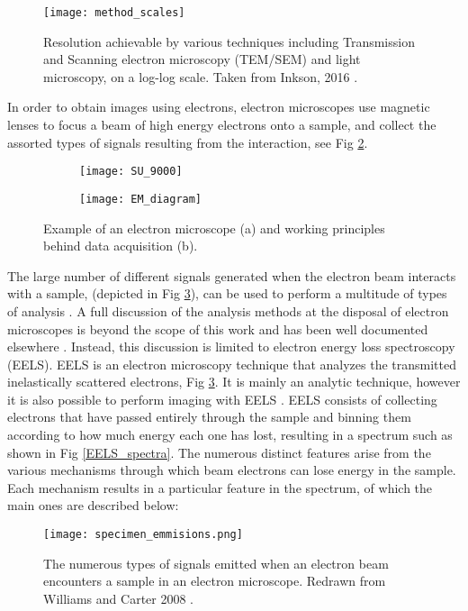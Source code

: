 \begin{figure}
	\centering
	\texttt{[image: method\_scales]}
	\caption{Resolution achievable by various techniques including Transmission and Scanning electron microscopy (TEM/SEM) and light microscopy, on a log-log scale.  Taken from Inkson, 2016 \cite{inkson_2_2016}.}
	\label{method_scales}
	
\end{figure}


In order to obtain images using electrons, electron microscopes use magnetic lenses to focus a beam of high energy electrons onto a sample, and collect the assorted types of signals resulting from the interaction, see Fig \ref{em_diagram}.\\


\begin{figure}
\begin{subfigure}{0.45\textwidth}
	\texttt{[image: SU\_9000]}
	\caption{}
\end{subfigure}
\hspace{0.05cm}
\begin{subfigure}{0.45\textwidth}
	\texttt{[image: EM\_diagram]}
	\caption{}
\end{subfigure}
	\caption{Example of an electron microscope (a) and working principles behind data acquisition (b). }
	\label{em_diagram}
\end{figure}

The large number of different signals generated when the electron beam interacts with a sample, (depicted in Fig \ref{specimen_emmisions}), can be used to perform a multitude of types of analysis \cite{williams_transmission_2008}.  A full discussion of the analysis methods at the disposal of electron microscopes is beyond the scope of this work and has been well documented elsewhere \cite{goldstein_electron_2003,Egerton,williams_transmission_2008,reimer_electron_1998}.  Instead, this discussion is limited to electron energy loss spectroscopy (EELS).  EELS is an electron microscopy technique that analyzes the transmitted inelastically scattered electrons, Fig \ref{specimen_emmisions}\cite{Egerton}.  It is mainly an analytic technique, however it is also possible to perform imaging with EELS \cite{varela_stem-eels_2012}.  EELS consists of collecting electrons that have passed entirely through the sample and binning them according to how much energy each one has lost, resulting in a spectrum such as shown in Fig \ref{EELS_spectra}.  The numerous distinct features arise from the various mechanisms through which beam electrons can lose energy in the sample.  Each mechanism results in a particular feature in the spectrum, of which the main ones are described below:
\begin{figure}
	\centering
	\texttt{[image: specimen\_emmisions.png]}
	\caption{The numerous types of signals emitted when an electron beam encounters a sample in an electron microscope.   Redrawn from Williams and Carter 2008 \cite{williams_transmission_2008}.  }
	\label{specimen_emmisions}
\end{figure}

